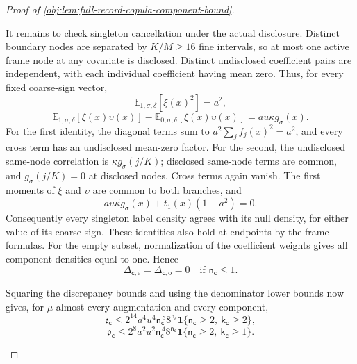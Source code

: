 \begin{proof}[Proof of \cref{obj:lem:full-record-copula-component-bound}]
\begin{enumerate}
It remains to check singleton cancellation under the actual disclosure. Distinct boundary nodes are separated by \(K/M\ge16\) fine intervals, so at most one active frame node at any covariate is disclosed. Distinct undisclosed coefficient pairs are independent, with each individual coefficient having mean zero. Thus, for every fixed coarse-sign vector,
\[
\mathbb E_{1,\sigma,\delta}[\xi(x)^2]=a^2,
\]
\[
\mathbb E_{1,\sigma,\delta}[\xi(x)\upsilon(x)]
 -\mathbb E_{0,\sigma,\delta}[\xi(x)\upsilon(x)]
 =au\kappa\widetilde g_\sigma(x).
\]
For the first identity, the diagonal terms sum to \(a^2\sum_jf_j(x)^2=a^2\), and every cross term has an undisclosed mean-zero factor. For the second, the undisclosed same-node correlation is
\(\kappa g_\sigma(j/K)\); disclosed same-node terms are common, and
\(g_\sigma(j/K)=0\) at disclosed nodes. Cross terms again vanish. The first moments of \(\xi\) and \(\upsilon\) are common to both branches, and
\[
au\kappa\widetilde g_\sigma(x)
 +t_1(x)(1-a^2)=0.
\]
Consequently every singleton label density agrees with its null density, for either value of its coarse sign. These identities also hold at endpoints by the frame formulas. For the empty subset, normalization of the coefficient weights gives all component densities equal to one. Hence
\[
\Delta_{\mathsf c,\mathrm e}
 =\Delta_{\mathsf c,\mathrm o}=0
\quad\text{if }\mathsf n_{\mathsf c}\le1.
\]

Squaring the discrepancy bounds and using the denominator lower bounds now gives, for \(\mu\)-almost every augmentation and every component,
\[
\mathfrak e_{\mathsf c}
 \le
 2^{14}a^4u^4\mathsf n_{\mathsf c}^{\,8}
       8^{\mathsf n_{\mathsf c}}
 \mathbf1\{\mathsf n_{\mathsf c}\ge2,\
           \mathsf k_{\mathsf c}\ge2\},
\]
\[
\mathfrak o_{\mathsf c}
 \le
 2^8a^2u^2\mathsf n_{\mathsf c}^{\,4}
       8^{\mathsf n_{\mathsf c}}
 \mathbf1\{\mathsf n_{\mathsf c}\ge2,\
           \mathsf k_{\mathsf c}\ge1\}.
\]


\end{enumerate}
\end{proof}
